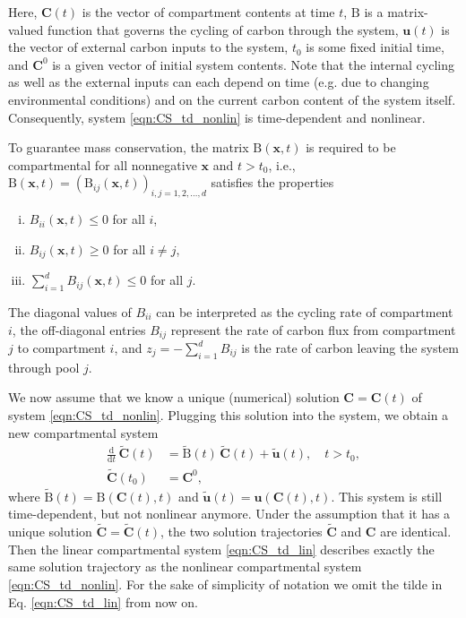 \documentclass[11pt,a4paper]{article}
\renewcommand{\vec}[1]{\mathbf{#1}}
\newcommand{\tens}[1]{\mathrm{#1}}
\newcommand{\deriv}[1]{\frac{\mathrm{d}}{\mathrm{d}#1}}
\newcommand{\suml}{\sum\limits}
\begin{document}
    Here, $\vec{C}(t)$ is the vector of compartment contents at time $t$, $\tens{B}$ is a matrix-valued function that governs the cycling of carbon through the system, $\vec{u}(t)$ is the vector of external carbon inputs to the system, $t_0$ is some fixed initial time, and $\vec{C}^0$ is a given vector  of initial system contents. Note that the internal cycling as well as the external inputs can each depend on time (e.g. due to changing environmental conditions) and on the current carbon content of the system itself. Consequently, system \eqref{eqn:CS_td_nonlin} is time-dependent and nonlinear.
    
    To guarantee mass conservation, the matrix $\tens{B}(\vec{x},t)$ is required to be compartmental 
    for all nonnegative $\vec{x}$ and $t>t_0$, i.e., $\tens{B}(\vec{x},t)=(\tens{B}_{ij}(\vec{x},t))_{i,j=1,2,\ldots,d}$ satisfies the properties
    \begin{enumerate}[(i)]
        \item $B_{ii}(\vec{x},t)\leq0$ for all $i$,
        \item $B_{ij}(\vec{x},t)\geq0$ for all $i\neq j$,
        \item $\suml_{i=1}^d B_{ij}(\vec{x},t)\leq0$ for all $j$.
    \end{enumerate}
    The diagonal values of $B_{ii}$ can be interpreted as the cycling rate of compartment $i$, the off-diagonal entries $B_{ij}$ represent the rate of carbon flux from compartment $j$ to compartment $i$, and $z_j=-\sum_{i=1}^d B_{ij}$ is the rate of carbon leaving the system through pool $j$.
    
    We now assume that we know a unique (numerical) solution $\vec{C}=\vec{C}(t)$ of system \eqref{eqn:CS_td_nonlin}.
    Plugging this solution into the system, we obtain a new compartmental system
    \begin{equation}\label{eqn:CS_td_lin}
        \begin{aligned}
            \deriv{t}\,\widetilde{\vec{C}}(t) &= \widetilde{\tens{B}}(t)\,\widetilde{\vec{C}}(t) + \widetilde{\vec{u}}(t),\quad t>t_0,\\
            \widetilde{\vec{C}}(t_0) &= \vec{C}^0,
        \end{aligned}
    \end{equation}
    where $\widetilde{\tens{B}}(t)=\tens{B}(\vec{C}(t),t)$ and $\widetilde{\vec{u}}(t)=\vec{u}(\vec{C}(t),t)$.
    This system is still time-dependent, but not nonlinear anymore.
    Under the assumption that it has a unique solution $\widetilde{\vec{C}}=\widetilde{\vec{C}}(t)$, the two solution trajectories $\widetilde{\vec{C}}$ and $\vec{C}$ are identical.
    Then the linear compartmental system \eqref{eqn:CS_td_lin} describes exactly the same solution trajectory as the nonlinear compartmental system \eqref{eqn:CS_td_nonlin}.
    For the sake of simplicity of notation we omit the tilde in Eq. \eqref{eqn:CS_td_lin} from now on.
    
\end{document}
